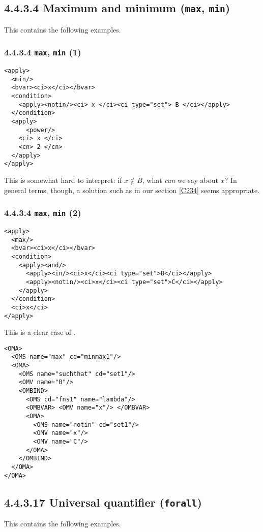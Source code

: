\documentclass{llncs}
\begin{document}
{\subsection{4.4.3.4 Maximum and minimum ({\tt max}, {\tt min})}\label{4434}
This contains the following examples.
\subsubsection{4.4.3.4 {\tt max}, {\tt min} (1)}\label{44341}
\begin{lstlisting}[language=MathML2]
<apply>
  <min/>
  <bvar><ci>x</ci></bvar>
  <condition>
    <apply><notin/><ci> x </ci><ci type="set"> B </ci></apply>
  </condition>
  <apply>
      <power/>
    <ci> x </ci>
    <cn> 2 </cn>
  </apply>
</apply>
\end{lstlisting}
This is somewhat hard to interpret: if $x\notin B$, what {\it can\/} we say
about $x$? In general terms, though, a solution such as in our section
\ref{C234} seems appropriate.
\subsubsection{4.4.3.4 {\tt max}, {\tt min} (2)}\label{44342}
\begin{lstlisting}[language=MathML2]
<apply>
  <max/>
  <bvar><ci>x</ci></bvar>
  <condition>
    <apply><and/>
      <apply><in/><ci>x</ci><ci type="set">B</ci></apply>
      <apply><notin/><ci>x</ci><ci type="set">C</ci></apply>
    </apply>
  </condition>
  <ci>x</ci>
</apply>
\end{lstlisting}
This is a clear case of {}.
\begin{lstlisting}
<OMA>
  <OMS name="max" cd="minmax1"/>
  <OMA>
    <OMS name="suchthat" cd="set1"/>
    <OMV name="B"/>
    <OMBIND>
      <OMS cd="fns1" name="lambda"/>
      <OMBVAR> <OMV name="x"/> </OMBVAR>
      <OMA>
        <OMS name="notin" cd="set1"/>
        <OMV name="x"/>
        <OMV name="C"/>
      </OMA>
    </OMBIND>
  </OMA>
</OMA>
\end{lstlisting}
\subsection{4.4.3.17 Universal quantifier ({\tt forall})}\label{44317}
This contains the following examples.
}
\end{document}
